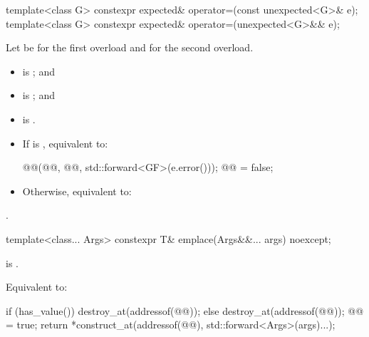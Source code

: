 %
\begin{itemdecl}
template<class G>
  constexpr expected& operator=(const unexpected<G>& e);
template<class G>
  constexpr expected& operator=(unexpected<G>&& e);
\end{itemdecl}

\begin{itemdescr}
\pnum
Let  be  for the first overload and
 for the second overload.

\pnum
\constraints
\begin{itemize}
\item
{} is ; and
\item
{} is ; and
\item
{} is .
\end{itemize}

\pnum
\effects
\begin{itemize}
\item
If  is , equivalent to:
\begin{codeblock}
@@(@@, @@, std::forward<GF>(e.error()));
@@ = false;
\end{codeblock}
\item
Otherwise, equivalent to:
\end{itemize}

\pnum
\returns
{}.
\end{itemdescr}

%
\begin{itemdecl}
template<class... Args>
  constexpr T& emplace(Args&&... args) noexcept;
\end{itemdecl}

\begin{itemdescr}
\pnum
\constraints
{} is .

\pnum
\effects
Equivalent to:
\begin{codeblock}
if (has_value()) {
  destroy_at(addressof(@@));
} else {
  destroy_at(addressof(@@));
  @@ = true;
}
return *construct_at(addressof(@@), std::forward<Args>(args)...);
\end{codeblock}
\end{itemdescr}

